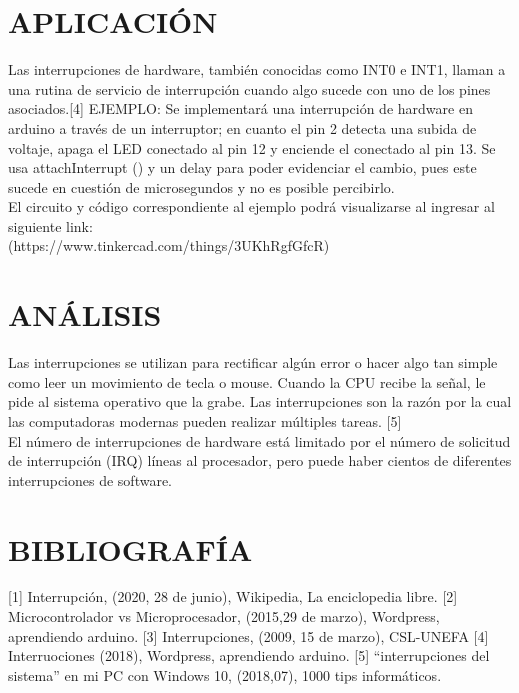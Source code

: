 \documentclass{article}
\begin{document}
\section{APLICACIÓN}
Las interrupciones de hardware, también conocidas como INT0 e INT1, llaman a una rutina de servicio de interrupción cuando algo sucede con uno de los pines asociados.[4]  
EJEMPLO:
Se implementará una interrupción de hardware en arduino a través de un interruptor; en cuanto el pin 2 detecta una subida de voltaje, apaga el LED conectado al pin 12 y enciende el conectado al pin 13. Se usa attachInterrupt () y un delay para poder evidenciar el cambio, pues este sucede en cuestión de microsegundos y no es posible percibirlo.
\\
El circuito y código correspondiente al ejemplo podrá visualizarse al ingresar al siguiente link: \\
(https://www.tinkercad.com/things/3UKhRgfGfcR)
\section{ANÁLISIS}
Las interrupciones se utilizan para rectificar algún error o hacer algo tan simple como leer un movimiento de tecla o mouse. Cuando la CPU recibe la señal, le pide al sistema operativo que la grabe. Las interrupciones son la razón por la cual las computadoras modernas pueden realizar múltiples tareas. [5] \\
El número de interrupciones de hardware está limitado por el número de solicitud de interrupción (IRQ) líneas al procesador, pero puede haber cientos de diferentes interrupciones de software.



\section{BIBLIOGRAFÍA}

[1] Interrupción, (2020, 28 de junio), Wikipedia, La enciclopedia libre.      
[2] Microcontrolador vs Microprocesador, (2015,29 de marzo), Wordpress, aprendiendo arduino. 
[3] Interrupciones, (2009, 15 de marzo), CSL-UNEFA
[4] Interruociones (2018), Wordpress, aprendiendo arduino. 
[5] “interrupciones del sistema” en mi PC con Windows 10, (2018,07), 1000 tips informáticos.
\end{document}
